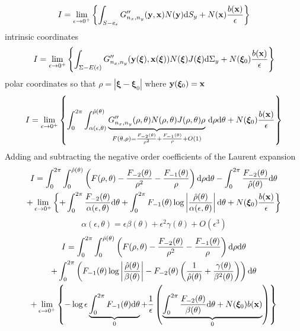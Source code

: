 \documentclass[a4paper,11pt]{article}
\newcommand{\td}{\mathrm{d}}
\begin{document}
\begin{equation}
I =
\lim_{\epsilon \to 0^+}
\left\{
\int_{S-e_{\epsilon}}
G''_{n_x,n_y}({\bf y}, {\bf x}) N({\bf y})
\td S_y
+
N({\bf x})
\frac{b({\bf x})}{\epsilon}
\right\}
\end{equation}
%
intrinsic coordinates
%
\begin{equation}
I =
\lim_{\epsilon \to 0^+}
\left\{
\int_{\Sigma-E(\epsilon)}
G''_{n_x,n_y}({\bf y}(\bm{\xi}), {\bf x}(\bm{\xi})) N(\bm{\xi}) J(\bm{\xi})
\td \Sigma_y
+
N(\bm{\xi}_0)
\frac{b({\bf x})}{\epsilon}
\right\}
\end{equation}
%
polar coordinates so that $\rho = |\bm{\xi}-\bm{\xi}_0|$ where ${\bf y}(\bm{\xi}_0) = {\bf x}$
%
\begin{equation}
I =
\lim_{\epsilon \to 0^+}
\left\{
\int_{0}^{2\pi}
\int_{\alpha(\epsilon, \theta)}^{\hat{\rho}(\theta)}
\underbrace{G''_{n_x,n_y}(\rho,\theta) N(\rho,\theta) J(\rho,\theta) \rho}_{
	F(\theta,\rho) = \frac{F_{-2}(\theta)}{\rho^2} + \frac{F_{-1}(\theta)}{\rho} + O(1)
} \,
\td \rho
\td \theta
+
N(\bm{\xi}_0)
\frac{b({\bf x})}{\epsilon}
\right\}
\end{equation}
%
Adding and subtracting the negative order coefficients of the Laurent expansion
%
\begin{multline}
I =
\int_{0}^{2\pi}
\int_{0}^{\hat{\rho}(\theta)}
\left(
	F(\rho,\theta) - \frac{F_{-2}(\theta)}{\rho^2} - \frac{F_{-1}(\theta)}{\rho}
\right)
\td \rho
\td \theta
-
\int_{0}^{2\pi}
	\frac{F_{-2}(\theta)}{\hat{\rho}(\theta)}
\td \theta
\\
+
\lim_{\epsilon \to 0^+}
\left\{
+
\int_{0}^{2\pi}
	\frac{F_{-2}(\theta)}{\alpha(\epsilon, \theta)}
\td \theta
+
\int_{0}^{2\pi}
F_{-1}(\theta) \log\left|
	\frac{\hat{\rho}(\theta)}{\alpha(\epsilon, \theta)}
	\right|
\td \theta
+
N(\bm{\xi}_0)
\frac{b({\bf x})}{\epsilon}
\right\}
\end{multline}
%
\begin{equation}
\alpha(\epsilon,\theta) = \epsilon \beta(\theta) + \epsilon^2 \gamma(\theta) + O(\epsilon^3)
\end{equation}
%
\begin{multline}
I =
\int_{0}^{2\pi}
\int_{0}^{\hat{\rho}(\theta)}
\left(
	F(\rho,\theta) - \frac{F_{-2}(\theta)}{\rho^2} - \frac{F_{-1}(\theta)}{\rho}
\right)
\td \rho
\td \theta
\\
+
\int_{0}^{2\pi}
\left(
F_{-1}(\theta) \log\left|
	\frac{\hat{\rho}(\theta)}{\beta(\theta)}
	\right|
-
	F_{-2}(\theta)
	\left(
	\frac{1}{\hat{\rho}(\theta)}
	+\frac{\gamma(\theta)}{\beta^2(\theta)}
	\right)
\right)
\td \theta
\\
+
\lim_{\epsilon \to 0^+}
\left\{
-
\log\epsilon
\underbrace{\int_{0}^{2\pi}
F_{-1}(\theta)
\td \theta}_{0}
+
\frac{1}{\epsilon}
\left(
\underbrace{
\int_{0}^{2\pi}
	\frac{F_{-2}(\theta)}{\beta(\theta)}
\td \theta
+
N(\bm{\xi}_0)
b({\bf x})
}_{0}
\right)
\right\}
\end{multline}
\end{document}
